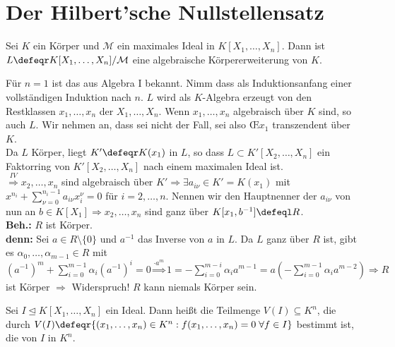 \section{Der Hilbert'sche Nullstellensatz}

\begin{Satz}
\label{Satz5}
  Sei $K$ ein Körper und $\mathcal{M}$ ein maximales Ideal in $K[X_1, \dots,
  X_n]$. Dann ist $L \defeqr K[X_1, \dots, X_n] / \mathcal{M}$ eine algebraische
  Körpererweiterung von $K$.
\end{Satz}

\begin{Bew}
  Für $n=1$ ist das aus Algebra I bekannt. Nimm dass als Induktionsanfang einer
  vollständigen Induktion nach $n$.
  $L$ wird als $K$-Algebra erzeugt von den Restklassen $x_1, \dots, x_n$ der
  $X_1, \dots, X_n$. Wenn $x_1, \dots, x_n$ algebraisch über $K$ sind, so auch
  $L$. Wir nehmen an, dass sei nicht der Fall, sei also \OE $x_1$ transzendent
  über $K$.\\
  Da $L$ Körper, liegt $K' \defeqr K(x_1)$ in $L$, so dass $L \subset K'[X_2,
  \dots, X_n]$ ein Faktorring von $K'[X_2, \dots, X_n]$ nach einem maximalen
  Ideal ist.\\
  $\overset{IV}{\Rightarrow} x_2, \dots, x_n$ sind algebraisch über $K'
  \Rightarrow \exists a_{i \nu} \in K'=K(x_1)$ mit $x^{n_i} + \sum_{\nu =
  0}^{n_i -1} a_{i \nu} x_i^{\nu} = 0$ für $i = 2, \dots, n$.
  Nennen wir den Hauptnenner der $a_{i \nu}$ von nun an $b \in K[X_1] \Rightarrow
  x_2, \dots, x_n$ sind ganz über $K[x_1, b^{-1}] \defeql R$.\\
  \textbf{Beh.:} $R$ ist Körper.\\
  \textbf{denn:} Sei $a \in R \setminus \{0\}$ und $a^{-1}$ das Inverse von $a$
  in $L$. Da $L$ ganz über $R$ ist, gibt es $\alpha_0, \dots, \alpha_{m-1} \in
  R$ mit $(a^{-1})^m + \sum_{i = 0}^{m-1} \alpha_i (a^{-1})^i = 0 \overset{
  \cdot a^m}{\Rightarrow} 1 = -\sum_{i=0}^{m-i} \alpha_i a^{m-1} = a
  (-\sum_{i=0}^{m-1} \alpha_i a^{m-2}) \Rightarrow R$ ist Körper $\Rightarrow$
  Widerspruch! $R$ kann niemals Körper sein.
\end{Bew}

\begin{Def}
  Sei $I \trianglelefteq K[X_1, \dots, X_n]$ ein Ideal. Dann heißt die Teilmenge
  $V(I) \subseteq K^n$, die durch $V(I) \defeqr \{(x_1, \dots, x_n) \in K^n:
  f(x_1, \dots, x_n) = 0 \; \forall f \in I\}$ bestimmt ist, die
   von $I$ in $K^n$.
\end{Def}

